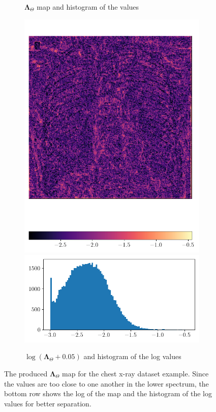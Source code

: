 \documentclass[12pt]{article}
\begin{document}
\begin{figure}[ht]
\begin{subfigure}{0.48\textwidth}
  \caption{$\mathbf{\Lambda}_{\Theta}$ map and histogram of the values}
  \end{subfigure}
  \begin{subfigure}{0.48\textwidth}
  \includegraphics[width=1\linewidth]{images//chest_xray/ex_2/lambda_map_log.png}
  \includegraphics[width=1\linewidth]{images//chest_xray/ex_2/lambda_map_values_histogram_log.png}
  \caption{$\log{(\mathbf{\Lambda}_{\Theta} + 0.05)}$ and histogram of the log values}
  \end{subfigure}
  \caption{The produced $\mathbf{\Lambda}_{\Theta}$ map for the chest x-ray dataset example. Since the values are too close to one another in the lower spectrum, the bottom row shows the log of the map and the histogram of the log values for better separation.}
  \label{fig:enter-label}
\end{figure}
\end{document}
